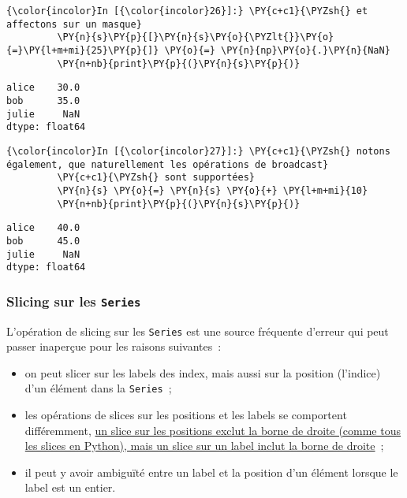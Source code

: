    \begin{Verbatim}[commandchars=\\\{\}]
{\color{incolor}In [{\color{incolor}26}]:} \PY{c+c1}{\PYZsh{} et affectons sur un masque}
         \PY{n}{s}\PY{p}{[}\PY{n}{s}\PY{o}{\PYZlt{}}\PY{o}{=}\PY{l+m+mi}{25}\PY{p}{]} \PY{o}{=} \PY{n}{np}\PY{o}{.}\PY{n}{NaN}
         \PY{n+nb}{print}\PY{p}{(}\PY{n}{s}\PY{p}{)}
\end{Verbatim}


    \begin{Verbatim}[commandchars=\\\{\}]
alice    30.0
bob      35.0
julie     NaN
dtype: float64

    \end{Verbatim}

    \begin{Verbatim}[commandchars=\\\{\}]
{\color{incolor}In [{\color{incolor}27}]:} \PY{c+c1}{\PYZsh{} notons également, que naturellement les opérations de broadcast}
         \PY{c+c1}{\PYZsh{} sont supportées}
         \PY{n}{s} \PY{o}{=} \PY{n}{s} \PY{o}{+} \PY{l+m+mi}{10}
         \PY{n+nb}{print}\PY{p}{(}\PY{n}{s}\PY{p}{)}
\end{Verbatim}


    \begin{Verbatim}[commandchars=\\\{\}]
alice    40.0
bob      45.0
julie     NaN
dtype: float64

    \end{Verbatim}

    \hypertarget{slicing-sur-les-series}{%
\subsubsection{\texorpdfstring{Slicing sur les
\texttt{Series}}{Slicing sur les Series}}\label{slicing-sur-les-series}}

    L'opération de slicing sur les \texttt{Series} est une source fréquente
d'erreur qui peut passer inaperçue pour les raisons suivantes~:

\begin{itemize}
\tightlist
\item
  on peut slicer sur les labels des index, mais aussi sur la position
  (l'indice) d'un élément dans la \texttt{Series}~;
\item
  les opérations de slices sur les positions et les labels se comportent
  différemment,
  \href{http://pandas.pydata.org/pandas-docs/stable/gotchas.html\#endpoints-are-inclusive}{un
  slice sur les positions exclut la borne de droite (comme tous les
  slices en Python), mais un slice sur un label inclut la borne de
  droite}~;
\item
  il peut y avoir ambiguïté entre un label et la position d'un élément
  lorsque le label est un entier.
\end{itemize}

